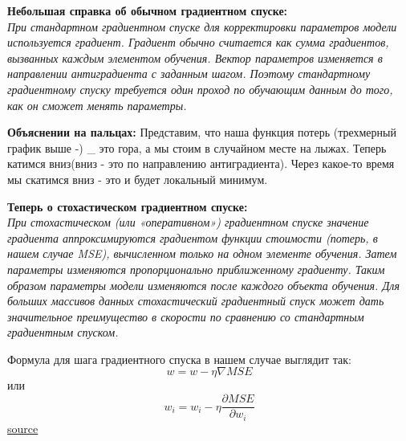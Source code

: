 \documentclass[11pt]{article}
\begin{document}
\textbf{Небольшая справка об обычном градиентном спуске:}\\
\emph{При стандартном градиентном спуске для корректировки параметров
модели используется градиент. Градиент обычно считается как сумма
градиентов, вызванных каждым элементом обучения. Вектор параметров
изменяется в направлении антиградиента с заданным шагом. Поэтому
стандартному градиентному спуску требуется один проход по обучающим
данным до того, как он сможет менять параметры.}

\textbf{Объяснении на пальцах:} Представим, что наша функция потерь
(трехмерный график выше -) \_ это гора, а мы стоим в случайном месте на
лыжах. Теперь катимся вниз(вниз - это по направлению антиградиента).
Через какое-то время мы скатимся вниз - это и будет локальный минимум.

\textbf{Теперь о стохастическом градиентном спуске:}\\
\emph{При стохастическом (или «оперативном») градиентном спуске значение
градиента аппроксимируются градиентом функции стоимости (потерь, в нашем
случае MSE), вычисленном только на одном элементе обучения. Затем
параметры изменяются пропорционально приближенному градиенту. Таким
образом параметры модели изменяются после каждого объекта обучения. Для
больших массивов данных стохастический градиентный спуск может дать
значительное преимущество в скорости по сравнению со стандартным
градиентным спуском.}

Формула для шага градиентного спуска в нашем случае выглядит так:
\[w = w - \eta \nabla MSE \] или \[
w_i = w_i - \eta \frac{\partial MSE}{\partial w_i}
\]
\href{http://www.machinelearning.ru/wiki/index.php?title=\%D0\%9C\%D0\%B5\%D1\%82\%D0\%BE\%D0\%B4_\%D1\%81\%D1\%82\%D0\%BE\%D1\%85\%D0\%B0\%D1\%81\%D1\%82\%D0\%B8\%D1\%87\%D0\%B5\%D1\%81\%D0\%BA\%D0\%BE\%D0\%B3\%D0\%BE_\%D0\%B3\%D1\%80\%D0\%B0\%D0\%B4\%D0\%B8\%D0\%B5\%D0\%BD\%D1\%82\%D0\%B0}{source}
\end{document}
